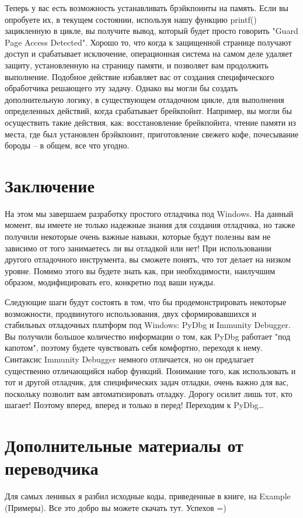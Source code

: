 \documentclass[12pt, a4paper, oneside]{book}
\begin{document}
Теперь у вас есть возможность устанавливать брэйкпоинты на память. Если вы опробуете их, в текущем состоянии, используя нашу функцию printf() зацикленную в цикле, вы получите вывод, который будет просто говорить "Guard Page Access Detected". Хорошо то, что когда к защищенной странице получают доступ и срабатывает исключение, операционная система на самом деле удаляет защиту, установленную на страницу памяти, и позволяет вам продолжить выполнение. Подобное действие избавляет вас от создания специфического обработчика решающего эту задачу. Однако вы могли бы создать дополнительную логику, в существующем отладочном цикле, для выполнения определенных действий, когда срабатывает брейкпойнт. Например, вы могли бы осуществить такие действия, как: восстановление брейкпойнта, чтение памяти из места, где был установлен брэйкпоинт, приготовление свежего кофе, почесывание бороды – в общем, все что угодно.

\section{Заключение}

На этом мы завершаем разработку простого отладчика под Windows. На данный момент, вы имеете не только надежные знания для создания отладчика, но также получили некоторые очень важные навыки, которые будут полезны вам не зависимо от того занимаетесь ли вы отладкой или нет! При использовании другого отладочного инструмента, вы сможете понять, что тот делает на низком уровне. Помимо этого вы будете знать как, при необходимости, наилучшим образом, модифицировать его, конкретно под ваши нужды.

Следующие шаги будут состоять в том, что бы продемонстрировать некоторые возможности, продвинутого использования, двух сформировавшихся и стабильных отладочных платформ под Windows: PyDbg и Immunity Debugger. Вы получили большое количество информации о том, как PyDbg работает "под капотом", поэтому будете чувствовать себя комфортно, переходя к нему. Синтаксис Immunity Debugger немного отличается, но он предлагает существенно отличающийся набор функций. Понимание того, как использовать и тот и другой отладчик, для специфических задач отладки, очень важно для вас, поскольку позволит вам автоматизировать отладку. Дорогу осилит лишь тот, кто шагает! Поэтому вперед, вперед и только в перед! Переходим к PyDbg…

\section{Дополнительные материалы от переводчика}
Для самых ленивых я разбил исходные коды, приведенные в книге, на Example (Примеры). Все это добро вы можете скачать тут. Успехов =)
\end{document}
